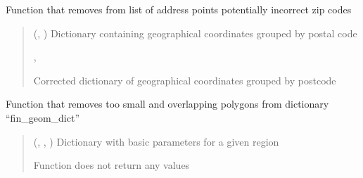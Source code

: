 \documentclass[letterpaper,10pt,english]{sphinxmanual}
\begin{document}

\begin{fulllineitems}
\label{\detokenize{pcm_utilities:pcm_utilities.rmv_prg_outlyrs}}
\pysigstartsignatures
{}
\pysigstopsignatures
\sphinxAtStartPar
Function that removes from list of address points potentially incorrect zip codes
\begin{quote}\begin{description}
\sphinxAtStartPar
{} (\sphinxcode{\sphinxupquote{Dict}}{[}, \sphinxcode{\sphinxupquote{ndarray}}{]}) \textendash{} Dictionary containing geographical coordinates grouped by postal code

\sphinxAtStartPar
\sphinxcode{\sphinxupquote{Dict}}{[}, \sphinxcode{\sphinxupquote{ndarray}}{]}

\sphinxAtStartPar
Corrected dictionary of geographical coordinates grouped by postcode

\end{description}\end{quote}

\end{fulllineitems}


\begin{fulllineitems}
\label{\detokenize{pcm_utilities:pcm_utilities.rmv_sml_ovrlp_polygs}}
\pysigstartsignatures
{}
\pysigstopsignatures
\sphinxAtStartPar
Function that removes too small and overlapping polygons from dictionary “fin\_geom\_dict”
\begin{quote}\begin{description}
\sphinxAtStartPar
{} (\sphinxcode{\sphinxupquote{Dict}}{[}, \sphinxcode{\sphinxupquote{Dict}}{[}, \sphinxcode{\sphinxupquote{Any}}{]}{]}) \textendash{} Dictionary with basic parameters for a given region

\sphinxAtStartPar
{}

\sphinxAtStartPar
Function does not return any values

\end{description}\end{quote}

\end{fulllineitems}
\end{document}
